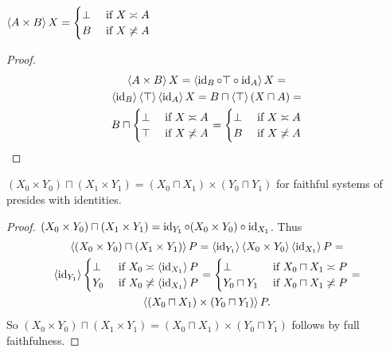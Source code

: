 \begin{prop}
$\left\langle A\times B\right\rangle X = \begin{cases}\bot&\text{ if }X\asymp A\\B&\text{ if }X\not\asymp A\end{cases}$
\end{prop}

\begin{proof}
~
\begin{multline*}
\left\langle A\times B\right\rangle X = \left\langle \operatorname{id}_B\circ\top\circ\operatorname{id}_A\right\rangle X = \\
\left\langle \operatorname{id}_B\right\rangle\left\langle \top\right\rangle\left\langle \operatorname{id}_A\right\rangle X =
B\sqcap\left\langle \top\right\rangle(X\sqcap A) = \\
B\sqcap\begin{cases}\bot&\text{ if }X\asymp A\\\top&\text{ if }X\not\asymp A\end{cases} =
\begin{cases}\bot&\text{ if }X\asymp A\\B&\text{ if }X\not\asymp A\end{cases}
\end{multline*}
\end{proof}

\begin{prop}
$(X_0\times Y_0)\sqcap(X_1\times Y_1) = (X_0\sqcap X_1)\times(Y_0\sqcap Y_1)$ for faithful systems of presides with identities.
\end{prop}

\begin{proof}
$(X_0\times Y_0)\sqcap(X_1\times Y_1) = \operatorname{id}_{Y_1}\circ(X_0\times Y_0)\circ\operatorname{id}_{X_1}$.
Thus
\begin{multline*}
\left\langle (X_0\times Y_0)\sqcap(X_1\times Y_1)\right\rangle P = \left\langle \operatorname{id}_{Y_1}\right\rangle\left\langle X_0\times Y_0\right\rangle\left\langle \operatorname{id}_{X_1}\right\rangle P = \\
\left\langle \operatorname{id}_{Y_1}\right\rangle\begin{cases}\bot&\text{ if }X_0\asymp\left\langle \operatorname{id}_{X_1}\right\rangle P\\Y_0&\text{ if }X_0\not\asymp\left\langle \operatorname{id}_{X_1}\right\rangle P\end{cases} =
\begin{cases}\bot&\text{ if }X_0\sqcap X_1\asymp P\\Y_0\sqcap Y_1&\text{ if }X_0\sqcap X_1\not\asymp P\end{cases} = \\
\left\langle (X_0\sqcap X_1)\times(Y_0\sqcap Y_1)\right\rangle P.
\end{multline*}
So $(X_0\times Y_0)\sqcap(X_1\times Y_1) = (X_0\sqcap X_1)\times(Y_0\sqcap Y_1)$ follows by full faithfulness.
\end{proof}

